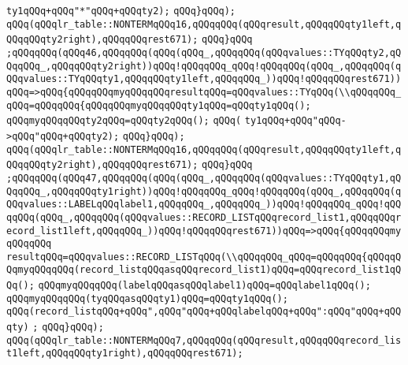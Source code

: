\verb|ty1qQQq+qQQq"*"qQQq+qQQqty2);|\newline
\verb|qQQq}qQQq);|\newline
\verb|qQQq(qQQqlr_table::NONTERMqQQq16,qQQqqQQq(qQQqresult,qQQqqQQqty1left,qQQqqQQqty2right),qQQqqQQqrest671);|\newline
\verb|qQQq}qQQq|\newline
\verb|;qQQqqQQq(qQQq46,qQQqqQQq(qQQq(qQQq_,qQQqqQQq(qQQqvalues::TYqQQqty2,qQQqqQQq_,qQQqqQQqty2right))qQQq!qQQqqQQq_qQQq!qQQqqQQq(qQQq_,qQQqqQQq(qQQqvalues::TYqQQqty1,qQQqqQQqty1left,qQQqqQQq_))qQQq!qQQqqQQqrest671))qQQq=>qQQq{qQQqqQQqmyqQQqqQQqresultqQQq=qQQqvalues::TYqQQq(\\qQQqqQQq_qQQq=qQQqqQQq{qQQqqQQqmyqQQqqQQqty1qQQq=qQQqty1qQQq();|\newline
\verb|qQQqmyqQQqqQQqty2qQQq=qQQqty2qQQq();|\newline
\verb|qQQq(|\newline
\verb|ty1qQQq+qQQq"qQQq->qQQq"qQQq+qQQqty2);|\newline
\verb|qQQq}qQQq);|\newline
\verb|qQQq(qQQqlr_table::NONTERMqQQq16,qQQqqQQq(qQQqresult,qQQqqQQqty1left,qQQqqQQqty2right),qQQqqQQqrest671);|\newline
\verb|qQQq}qQQq|\newline
\verb|;qQQqqQQq(qQQq47,qQQqqQQq(qQQq(qQQq_,qQQqqQQq(qQQqvalues::TYqQQqty1,qQQqqQQq_,qQQqqQQqty1right))qQQq!qQQqqQQq_qQQq!qQQqqQQq(qQQq_,qQQqqQQq(qQQqvalues::LABELqQQqlabel1,qQQqqQQq_,qQQqqQQq_))qQQq!qQQqqQQq_qQQq!qQQqqQQq(qQQq_,qQQqqQQq(qQQqvalues::RECORD_LISTqQQqrecord_list1,qQQqqQQqrecord_list1left,qQQqqQQq_))qQQq!qQQqqQQqrest671))qQQq=>qQQq{qQQqqQQqmyqQQqqQQq|\newline
\verb|resultqQQq=qQQqvalues::RECORD_LISTqQQq(\\qQQqqQQq_qQQq=qQQqqQQq{qQQqqQQqmyqQQqqQQq(record_listqQQqasqQQqrecord_list1)qQQq=qQQqrecord_list1qQQq();|\newline
\verb|qQQqmyqQQqqQQq(labelqQQqasqQQqlabel1)qQQq=qQQqlabel1qQQq();|\newline
\verb|qQQqmyqQQqqQQq(tyqQQqasqQQqty1)qQQq=qQQqty1qQQq();|\newline
\verb|qQQq(record_listqQQq+qQQq",qQQq"qQQq+qQQqlabelqQQq+qQQq":qQQq"qQQq+qQQqty)|\newline
\verb|;|\newline
\verb|qQQq}qQQq);|\newline
\verb|qQQq(qQQqlr_table::NONTERMqQQq7,qQQqqQQq(qQQqresult,qQQqqQQqrecord_list1left,qQQqqQQqty1right),qQQqqQQqrest671);|\newline
